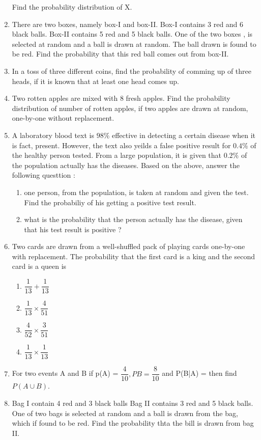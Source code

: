 \begin{enumerate}
Find the probability distribution of X.
\item There are two boxes, namely box-I and box-II. Box-I contains  3 red and 6 black balls. Box-II contains 5 red and 5 black balls. One of the two boxes , is selected at random and a ball is drawn at random. The ball drawn is found to be red. Find the probability that this red ball comes out from box-II.
\item In a toss of three different coins, find the probability of comming up of three heads, if it is known that at least one head comes up.
\item Two rotten apples are mixed with 8 fresh apples. Find the probability distribution of number of rotten apples, if two apples are drawn at  random, one-by-one without replacement.
\item A laboratory blood text is $98\%$ effective  in detecting a certain disease when it is fact, present. However, the text also yeilds a false positive result for $0.4\%$ of the healthy person tested. From a large population, it is given that $0.2\%$ of the population actually has the diseases.
Based on the above, answer the following questtion : \\
\begin{enumerate}
\item one person, from the population, is taken at random and given the test. Find the probabiliy of his getting a positive test result.
\item what is the probability that the person actually has the disease, given that his test result is positive ?
\end{enumerate}
\item Two cards are drawn from a well-shuffled pack of playing cards one-by-one with replacement. The probability that the first card is a king and the second card is a queen is 
\begin{enumerate}
	\item $\dfrac{1}{13} + \dfrac{1}{13}$
	\item $ \dfrac{1}{13} \times \dfrac{4}{51}$
	\item $\dfrac{4}{52} \times \dfrac{3}{51}$
	\item $\dfrac{1}{13} \times \dfrac{1}{13}$
\end{enumerate}
\item For two events A and B if p(A) = $\dfrac{4}{10}, P{B} = \dfrac{8}{10}$ and P(B|A) = then find $P( A \cup B).$
\item Bag I contain 4 red and 3 black balls Bag II contains 3 red and 5 black balls. One of two bags is selected at random and a ball is drawn from the bag, which if found to be red. Find the probability thta the bill is drawn from bag II.

\end{enumerate}
